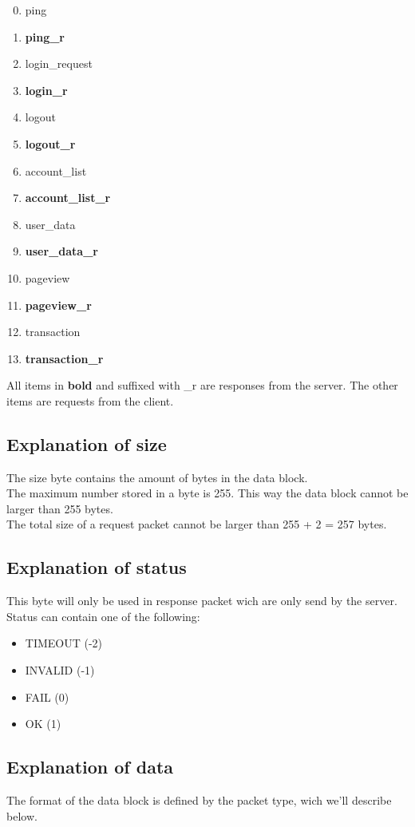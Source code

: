 \documentclass[12pt, a4paper]{article}
\begin{document}
\begin{enumerate}
	\setcounter{enumi}{-1}
	\item ping
	\item \textbf{ping\_r}
	\item login\_request
	\item \textbf{login\_r}
	\item logout
	\item \textbf{logout\_r}
	\item account\_list
	\item \textbf{account\_list\_r}
	\item user\_data
	\item \textbf{user\_data\_r}
	\item pageview
	\item \textbf{pageview\_r}
	\item transaction
	\item \textbf{transaction\_r}
\end{enumerate}

All items in \textbf{bold} and suffixed with \_r are responses from the server.
The other items are requests from the client.

\subsection{Explanation of size}
The size byte contains the amount of bytes in the data block.\\
The maximum number stored in a byte is 255. This way the data block
cannot be larger than 255 bytes.\\ The total size of a request
packet cannot be larger than 255 + 2 = 257 bytes.

\subsection{Explanation of status}
This byte will only be used in response packet wich are only send by the server.\\
Status can contain one of the following:\\
\begin{itemize}
	\item TIMEOUT (-2)
	\item INVALID (-1)
	\item FAIL (0)
	\item OK (1)
\end{itemize}

\subsection{Explanation of data}
The format of the data block is defined by the packet type, wich we'll describe below.
\end{document}
